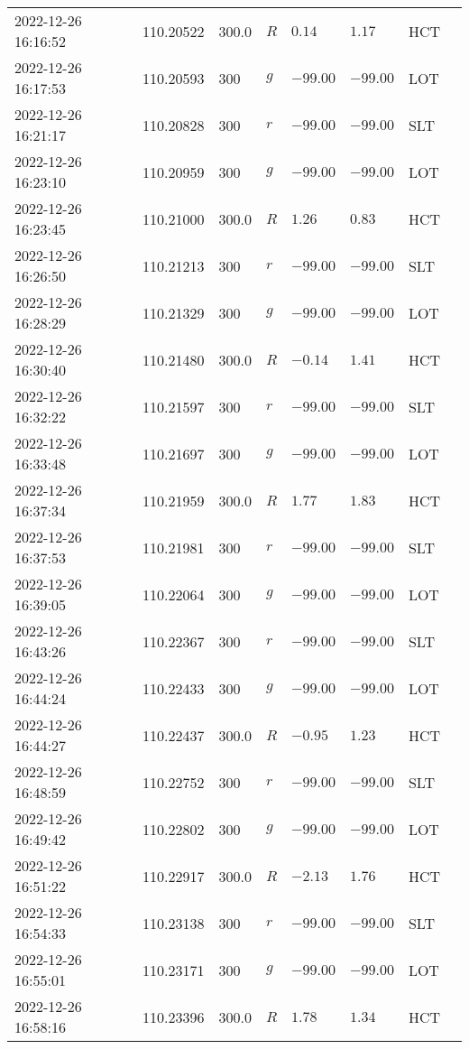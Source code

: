 \documentclass{nature_plusfigure}
\begin{document}
\begin{supplement}
\begin{center}
\begin{longtable}{llllllll}
2022-12-26 16:16:52 & 110.20522 & 300.0 & $R$ & $0.14$ & $1.17$ & HCT &  \\ 
2022-12-26 16:17:53 & 110.20593 & 300 & $g$ & $-99.00$ & $-99.00$ & LOT &  \\ 
2022-12-26 16:21:17 & 110.20828 & 300 & $r$ & $-99.00$ & $-99.00$ & SLT &  \\ 
2022-12-26 16:23:10 & 110.20959 & 300 & $g$ & $-99.00$ & $-99.00$ & LOT &  \\ 
2022-12-26 16:23:45 & 110.21000 & 300.0 & $R$ & $1.26$ & $0.83$ & HCT &  \\ 
2022-12-26 16:26:50 & 110.21213 & 300 & $r$ & $-99.00$ & $-99.00$ & SLT &  \\ 
2022-12-26 16:28:29 & 110.21329 & 300 & $g$ & $-99.00$ & $-99.00$ & LOT &  \\ 
2022-12-26 16:30:40 & 110.21480 & 300.0 & $R$ & $-0.14$ & $1.41$ & HCT &  \\ 
2022-12-26 16:32:22 & 110.21597 & 300 & $r$ & $-99.00$ & $-99.00$ & SLT &  \\ 
2022-12-26 16:33:48 & 110.21697 & 300 & $g$ & $-99.00$ & $-99.00$ & LOT &  \\ 
2022-12-26 16:37:34 & 110.21959 & 300.0 & $R$ & $1.77$ & $1.83$ & HCT &  \\ 
2022-12-26 16:37:53 & 110.21981 & 300 & $r$ & $-99.00$ & $-99.00$ & SLT &  \\ 
2022-12-26 16:39:05 & 110.22064 & 300 & $g$ & $-99.00$ & $-99.00$ & LOT &  \\ 
2022-12-26 16:43:26 & 110.22367 & 300 & $r$ & $-99.00$ & $-99.00$ & SLT &  \\ 
2022-12-26 16:44:24 & 110.22433 & 300 & $g$ & $-99.00$ & $-99.00$ & LOT &  \\ 
2022-12-26 16:44:27 & 110.22437 & 300.0 & $R$ & $-0.95$ & $1.23$ & HCT &  \\ 
2022-12-26 16:48:59 & 110.22752 & 300 & $r$ & $-99.00$ & $-99.00$ & SLT &  \\ 
2022-12-26 16:49:42 & 110.22802 & 300 & $g$ & $-99.00$ & $-99.00$ & LOT &  \\ 
2022-12-26 16:51:22 & 110.22917 & 300.0 & $R$ & $-2.13$ & $1.76$ & HCT &  \\ 
2022-12-26 16:54:33 & 110.23138 & 300 & $r$ & $-99.00$ & $-99.00$ & SLT &  \\ 
2022-12-26 16:55:01 & 110.23171 & 300 & $g$ & $-99.00$ & $-99.00$ & LOT &  \\ 
2022-12-26 16:58:16 & 110.23396 & 300.0 & $R$ & $1.78$ & $1.34$ & HCT &  \\ 

\end{longtable}
\end{center}
\end{supplement}
\end{document}
